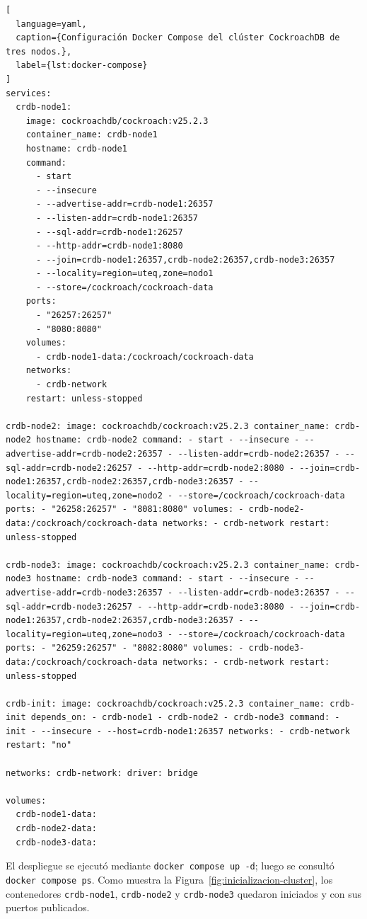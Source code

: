 \documentclass[12pt,a4paper]{article}
\begin{document}
\begin{lstlisting}[
  language=yaml,
  caption={Configuración Docker Compose del clúster CockroachDB de tres nodos.},
  label={lst:docker-compose}
]
services:
  crdb-node1:
    image: cockroachdb/cockroach:v25.2.3
    container_name: crdb-node1
    hostname: crdb-node1
    command:
      - start
      - --insecure
      - --advertise-addr=crdb-node1:26357
      - --listen-addr=crdb-node1:26357
      - --sql-addr=crdb-node1:26257
      - --http-addr=crdb-node1:8080
      - --join=crdb-node1:26357,crdb-node2:26357,crdb-node3:26357
      - --locality=region=uteq,zone=nodo1
      - --store=/cockroach/cockroach-data
    ports:
      - "26257:26257"
      - "8080:8080"
    volumes:
      - crdb-node1-data:/cockroach/cockroach-data
    networks:
      - crdb-network
    restart: unless-stopped

crdb-node2: image: cockroachdb/cockroach:v25.2.3 container_name: crdb-node2 hostname: crdb-node2 command: - start - --insecure - --advertise-addr=crdb-node2:26357 - --listen-addr=crdb-node2:26357 - --sql-addr=crdb-node2:26257 - --http-addr=crdb-node2:8080 - --join=crdb-node1:26357,crdb-node2:26357,crdb-node3:26357 - --locality=region=uteq,zone=nodo2 - --store=/cockroach/cockroach-data ports: - "26258:26257" - "8081:8080" volumes: - crdb-node2-data:/cockroach/cockroach-data networks: - crdb-network restart: unless-stopped

crdb-node3: image: cockroachdb/cockroach:v25.2.3 container_name: crdb-node3 hostname: crdb-node3 command: - start - --insecure - --advertise-addr=crdb-node3:26357 - --listen-addr=crdb-node3:26357 - --sql-addr=crdb-node3:26257 - --http-addr=crdb-node3:8080 - --join=crdb-node1:26357,crdb-node2:26357,crdb-node3:26357 - --locality=region=uteq,zone=nodo3 - --store=/cockroach/cockroach-data ports: - "26259:26257" - "8082:8080" volumes: - crdb-node3-data:/cockroach/cockroach-data networks: - crdb-network restart: unless-stopped

crdb-init: image: cockroachdb/cockroach:v25.2.3 container_name: crdb-init depends_on: - crdb-node1 - crdb-node2 - crdb-node3 command: - init - --insecure - --host=crdb-node1:26357 networks: - crdb-network restart: "no"

networks: crdb-network: driver: bridge

volumes:
  crdb-node1-data:
  crdb-node2-data:
  crdb-node3-data:
\end{lstlisting}

El despliegue se ejecutó mediante \texttt{docker compose up -d}; luego se consultó \texttt{docker compose ps}. Como muestra la Figura~\ref{fig:inicializacion-cluster}, los contenedores \texttt{crdb-node1}, \texttt{crdb-node2} y \texttt{crdb-node3} quedaron iniciados y con sus puertos publicados.
\end{document}
